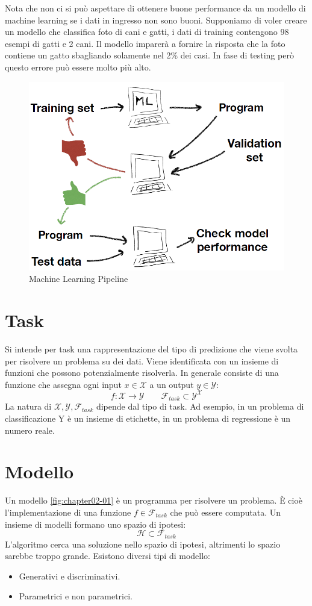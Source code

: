 	Nota che non ci si può aspettare di ottenere buone performance da un modello di machine learning se i dati in ingresso non sono buoni. 
	Supponiamo di voler creare un modello che classifica foto di cani e gatti, i dati di training contengono 98 esempi di gatti e 2 cani. 
	Il modello imparerà a fornire la risposta che la foto contiene un gatto sbagliando solamente nel 2\% dei casi. 
	In fase di testing per\`o questo errore pu\`o essere molto pi\`u alto.
	\begin{figure}
		\centering
		\includegraphics[width=0.4\linewidth]{imgs/chapter2/img0}
		\caption{Machine Learning Pipeline}
		\label{fig:chapter02-00}
	\end{figure}
\section{Task}
Si intende per task una rappresentazione del tipo di predizione che viene svolta per risolvere un problema su dei dati.
Viene identificata con un insieme di funzioni che possono potenzialmente risolverla.
In generale consiste di una funzione che assegna ogni input $x\in\mathcal{X}$ a un output $y\in\mathcal{Y}$:
$$f:\mathcal{X}\rightarrow\mathcal{Y}\qquad\mathcal{F}_{task}\subset\mathcal{Y^X}$$
La natura di $\mathcal{X},\mathcal{Y}, \mathcal{F}_{task}$ dipende dal tipo di task. 
Ad esempio, in un problema di classificazione Y è un insieme di etichette, in un problema di regressione è un numero reale.

\section{Modello}
Un modello \ref{fig:chapter02-01} \`e un programma per risolvere un problema.
\`E cio\`e l'implementazione di una funzione $f\in\mathcal{F}_{task}$ che pu\`o essere computata.
Un insieme di modelli formano uno spazio di ipotesi:
$$\mathcal{H}\subset\mathcal{F}_{task}$$
L'algoritmo cerca una soluzione nello spazio di ipotesi, altrimenti lo spazio sarebbe troppo grande.
Esistono diversi tipi di modello:
\begin{multicols}{2}
	\begin{itemize}
		\item Generativi e discriminativi.
		\item Parametrici e non parametrici.
	\end{itemize}
\end{multicols}

